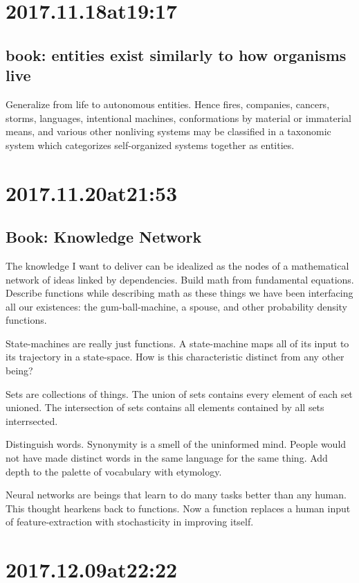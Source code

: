 \section*{ 2017.11.18at19:17 }
\subsection*{ book: entities exist similarly to how organisms live }
Generalize from life to autonomous entities. Hence fires, companies, cancers, storms, languages, intentional machines, conformations by material or immaterial means, and various other nonliving systems may be classified in a taxonomic system which categorizes self-organized systems together as entities.

\section*{ 2017.11.20at21:53 }
\subsection*{ Book: Knowledge Network }
The knowledge I want to deliver can be idealized as the nodes of a mathematical network of ideas linked by dependencies.
Build math from fundamental equations.
Describe functions while describing math as these things we have been interfacing all our existences: the gum-ball-machine, a spouse, and other probability density functions.

State-machines are really just functions.
A state-machine maps all of its input to its trajectory in a state-space.
How is this characteristic distinct from any other being?

Sets are collections of things.
The union of sets contains every element of each set unioned.
The intersection of sets contains all elements contained by all sets interrsected.

Distinguish words.
Synonymity is a smell of the uninformed mind.
People would not have made distinct words in the same language for the same thing.
Add depth to the palette of vocabulary with etymology.

Neural networks are beings that learn to do many tasks better than any human.
This thought hearkens back to functions. Now a function replaces a human input of feature-extraction with stochasticity in improving itself.

\section*{ 2017.12.09at22:22 }
